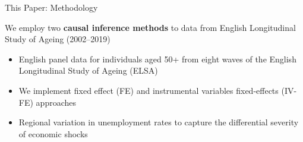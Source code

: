 \documentclass{beamer}
\begin{document}
\begin{frame}{This Paper: Methodology}

\begin{block}{}
\footnotesize
\centering
We employ two \textbf{causal inference methods} to data from English Longitudinal Study of Ageing (2002–2019)
\end{block}

   \vspace{0.25cm}
  
\begin{itemize}
\footnotesize

 \item<2-> English \begingroup\color{Blue}panel \endgroup data for individuals aged 50+ from eight waves of the \begingroup\color{Blue}English Longitudinal Study of Ageing (ELSA)\endgroup
 
   \vspace{0.25cm}
  
\item<3-> We implement \begingroup\color{Blue}fixed effect (FE) \endgroup and \begingroup\color{Blue}instrumental variables fixed-effects (IV-FE) \endgroup approaches 

   \vspace{0.25cm}
  
\item<4-> Regional variation in \begingroup\color{Blue}unemployment rates \endgroup to capture the differential severity of economic shocks
\end{itemize}

\vskip 1cm



\end{frame}
\end{document}
